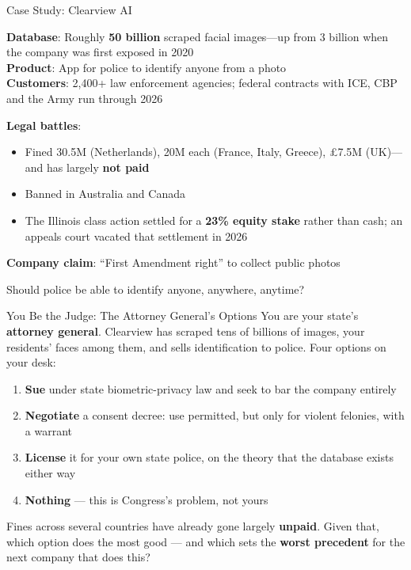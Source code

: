 ﻿\documentclass[aspectratio=169,11pt]{beamer}
\begin{document}
\begin{frame}[shrink=10]{Case Study: Clearview AI}
\begin{casestudybox}
\small
\textbf{Database}: Roughly \textbf{50 billion} scraped facial images---up from 3 billion when the company was first exposed in 2020\\
\textbf{Product}: App for police to identify anyone from a photo\\
\textbf{Customers}: 2,400+ law enforcement agencies; federal contracts with ICE, CBP and the Army run through 2026
\end{casestudybox}

\vspace{0.2em}
\textbf{Legal battles}:
\begin{itemize}
    \item Fined \texteuro30.5M (Netherlands), \texteuro20M each (France, Italy, Greece), \pounds7.5M (UK)---and has largely \textbf{not paid}
    \item Banned in Australia and Canada
    \item The Illinois class action settled for a \textbf{23\% equity stake} rather than cash; an appeals court vacated that settlement in 2026
\end{itemize}

\textbf{Company claim}: ``First Amendment right'' to collect public photos

\begin{discussionbox}[Discussion]
Should police be able to identify anyone, anywhere, anytime?
\end{discussionbox}
\end{frame}
\begin{frame}[shrink=8]{You Be the Judge: The Attorney General's Options}
You are your state's \textbf{attorney general}. Clearview has scraped tens of billions of images, your residents' faces among them, and sells identification to police. Four options on your desk:

\begin{enumerate}
    \item \textbf{Sue} under state biometric-privacy law and seek to bar the company entirely
    \item \textbf{Negotiate} a consent decree: use permitted, but only for violent felonies, with a warrant
    \item \textbf{License} it for your own state police, on the theory that the database exists either way
    \item \textbf{Nothing} --- this is Congress's problem, not yours
\end{enumerate}

\begin{discussionbox}
Fines across several countries have already gone largely \textbf{unpaid}. Given that, which option does the most good --- and which sets the \textbf{worst precedent} for the next company that does this?
\end{discussionbox}
\end{frame}
\end{document}
